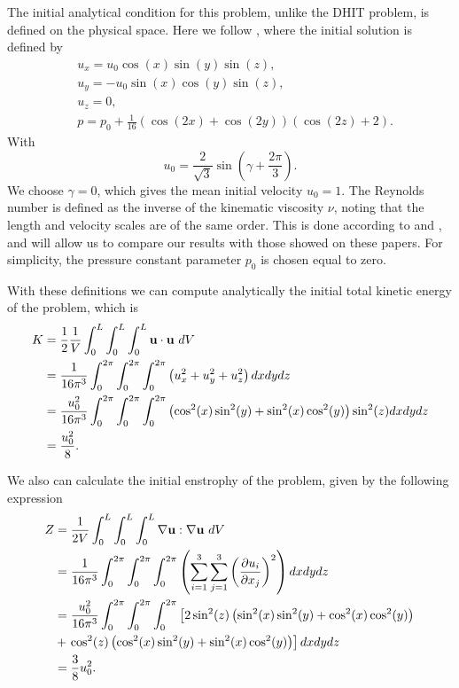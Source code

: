 The initial analytical condition for this problem, unlike the DHIT problem, is defined on the physical space. Here we follow \cite{gassner_accuracy_2013}, where the initial solution is defined by
\begin{align}
\label{eq-TGV_initial_condition}
&u_x=u_0\cos(x)\sin(y)\sin(z),\\\nonumber
&u_y=-u_0\sin(x)\cos(y)\sin(z),\\\nonumber
&u_z=0,\\\nonumber
&p=p_0+\frac{1}{16}\left(\cos(2x)+\cos(2y)\right)\left(\cos(2z)+2\right).
\end{align}
With
$$u_0=\frac{2}{\sqrt{3}}\sin\left(\gamma+\frac{2\pi}{3}\right).$$
We choose $\gamma=0$, which gives the mean initial velocity  $u_0=1$. The Reynolds number is defined as the inverse of the kinematic viscosity $\nu$, noting that the length and velocity scales are of the same order. This is done according to \cite{gassner_accuracy_2013} and \cite{brachet_direct_1991}, and will allow us to compare our results with those showed on these papers. For simplicity, the pressure constant parameter $p_0$ is chosen equal to zero.

With these definitions we can compute analytically the initial total kinetic energy of the problem, which is 
\begin{align}
\label{eq-TGV_initial_energy}
K&=\frac{1}{2}\frac{1}{V}\int_0^L\int_0^L\int_0^L\u\cdot\u\ dV\\\nonumber
&=\frac{1}{16\pi^3}\int_0^{2\pi}\int_0^{2\pi}\int_0^{2\pi}\left(u_x^2+u_y^2+u_z^2\right)dxdydz\\\nonumber
&=\frac{u_0^2}{16\pi^3}\int_0^{2\pi}\int_0^{2\pi}\int_0^{2\pi}\left(\cos^2(x)\sin^2(y)+\sin^2(x)\cos^2(y)\right)\sin^2(z)dxdydz\\\nonumber
&=\frac{u_0^2}{8}.
\end{align}

We also can calculate the initial enstrophy of the problem, given by the following expression
\begin{align}
\label{eq-TGV_wnstrophy}
Z&=\frac{1}{2V}\int_0^L\int_0^L\int_0^L\nabla\u:\nabla\u\ dV\\\nonumber
&=\frac{1}{16\pi^3}\int_0^{2\pi}\int_0^{2\pi}\int_0^{2\pi}\left(\sum_{i=1}^3\sum_{j=1}^3\left(\frac{\partial u_i}{\partial x_j}\right)^2\right)dxdydz\\\nonumber
&=\frac{u_0^2}{16\pi^3}\int_0^{2\pi}\int_0^{2\pi}\int_0^{2\pi}\left[2\sin^2(z)\left(\sin^2(x)\sin^2(y)+\cos^2(x)\cos^2(y)\right)\right.\\\nonumber
&+\left.\cos^2(z)\left(\cos^2(x)\sin^2(y)+\sin^2(x)\cos^2(y)\right)\right]dxdydz\\\nonumber
&=\frac{3}{8}u_0^2.
\end{align}

